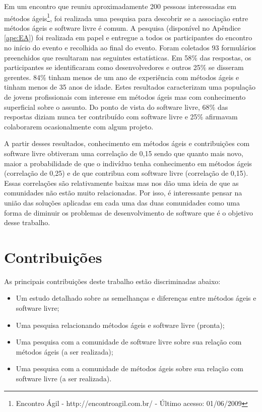Em um encontro que reuniu aproximadamente 200 pessoas interessadas em
métodos ágeis\footnote{Encontro Ágil - http://encontroagil.com.br/ -
  Último acesso: 01/06/2009}, foi realizada uma pesquisa para
descobrir se a associação entre métodos ágeis e software livre é
comum. A pesquisa (disponível no Apêndice \ref{ape:EA}) foi realizada
em papel e entregue a todos os participantes do encontro no início do
evento e recolhida ao final do evento. Foram coletados 93 formulários
preenchidos que resultaram nas seguintes estatísticas. %
Em 58\% das respostas, os participantes se identificaram como
desenvolvedores e outros 25\% se disseram gerentes. 84\% tinham menos
de um ano de experiência com métodos ágeis e tinham menos de 35 anos
de idade. Estes resultados caracterizam uma população de jovens
profissionais com interesse em métodos ágeis mas com conhecimento
superficial sobre o assunto. Do ponto de vista do software livre, 68\%
das respostas diziam nunca ter contribuído com software livre e 25\%
afirmavam colaborarem ocasionalmente com algum projeto.

A partir desses resultados, conhecimento em métodos ágeis e
contribuições com software livre obtiveram uma correlação de 0,15
sendo que quanto mais novo, maior a probabilidade de que o indivíduo
tenha conhecimento em métodos ágeis (correlação de 0,25) e de que
contribua com software livre (correlação de 0,15). Essas correlações
são relativamente baixas mas nos dão uma ideia de que as comunidades
não estão muito relacionadas. Por isso, é interessante pensar na união
das soluções aplicadas em cada uma das duas comunidades como uma forma
de diminuir os problemas de desenvolvimento de software que é o
objetivo desse trabalho.

\section{Contribuições}
\label{sec:contribucoes}

As principais contribuições deste trabalho estão discriminadas abaixo:

\begin{itemize}
\item Um estudo detalhado sobre as semelhanças e diferenças entre
  métodos ágeis e software livre;
\item Uma pesquisa relacionando métodos ágeis e software livre
  (pronta);
\item Uma pesquisa com a comunidade de software livre sobre sua
  relação com métodos ágeis (a ser realizada);
\item Uma pesquisa com a comunidade de métodos ágeis sobre sua relação
  com software livre (a ser realizada).
\end{itemize}

